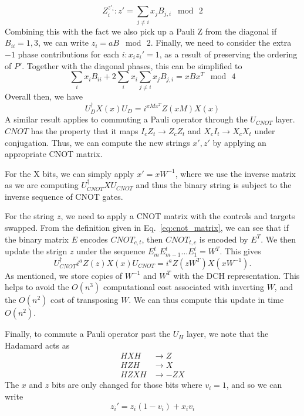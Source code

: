 \[Z_{i}^{z'_{i}}:z' = \sum_{j\neq i}x_{j}B_{j,i}\;\bmod\,2\]
Combining this with the fact we also pick up a Pauli Z from the diagonal if $B_{ii}=1,3$, we can write $z_{i}=aB\;\bmod\,2$. Finally, we need to consider the extra $-1$ phase  contributions for each $i:x_{i}z_{i}'=1$, as a result of preserving the ordering of $P'$. Together with the diagonal phases, this can be simplified to
\[
\sum_{i}x_{i}B_{ii} + 2\sum_{i}x_{i}\sum_{j\neq i}x_{j}B_{j,i} = xBx^{T}\;\bmod\, 4
\]
Overall then, we have
\begin{equation}
U_{D}^{\dagger}X(x)U_{D} = i^{xMx^{T}}Z(xM)X(x)
\label{eq:dch_dupdate}
\end{equation}
A similar result applies to commuting a Pauli operator through the $U_{CNOT}$ layer. $CNOT$ has the property that it maps $I_{c}Z_{t}\rightarrow Z_{c}Z_{t}$ and $X_{c}I_{t}\rightarrow X_{c}X_{t}$ under conjugation. Thus, we can compute the new strings $x',z'$ by applying an appropriate CNOT matrix.\par
For the X bits, we can simply apply $x'=xW^{-1}$, where we use the inverse matrix as we are computing $U_{CNOT}^{\dagger} X U_{CNOT}$ and thus the binary string is subject to the inverse sequence of CNOT gates. \par
For the string $z$, we need to apply a CNOT matrix with the controls and targets swapped. From the definition given in Eq.~\ref{eq:cnot_matrix}, we can see that if the binary matrix $E$ encodes $CNOT_{c,t}$, then $CNOT_{t,c}$ is encoded by $E^{T}$. We then update the strign $z$ under the sequence $E_{m}^{t}E_{m-1}^{t}\dots E_{1}^{t} = W^{T}$. This gives
\begin{equation}
U_{CNOT}^{\dagger}i^{a}Z(z)X(x)U_{CNOT} = i^{a}Z(zW^{T})X(xW^{-1}).
\label{eq:dch_cupdate}
\end{equation}
As mentioned, we store copies of $W^{-1}$ and $W^{T}$ with the DCH representation. This helps to avoid the $O(n^{3})$ computational cost associated with inverting $W$, and the $O(n^{2})$ cost of transposing $W$. We can thus compute this update in time $O(n^{2})$.\par
Finally, to commute a Pauli operator past the $U_{H}$ layer, we note that the Hadamard acts as
\[
\begin{array}{rcl}
HXH & \rightarrow Z\\
HZH & \rightarrow X\\
HZXH & \rightarrow -ZX
\end{array}
\]
The $x$ and $z$ bits are only changed for those bits where $v_{i}=1$, and so we can write
\[z_{i}' = z_{i}(1-v_{i}) + x_{i}v_{i}\]
